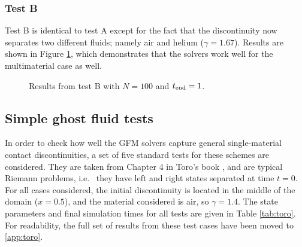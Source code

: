\documentclass[final,3p,twocolumn]{elsarticle}
\begin{document}
\subsubsection{Test B}

Test B is identical to test A except for the fact that the discontinuity now
separates two different fluids; namely air and helium ($\gamma=1.67$).  Results
are shown in Figure \ref{fig:testB}, which demonstrates that the solvers work
well for the multimaterial case as well. 


\begin{figure}[htb]
    \centering
    \caption[caption]
    {
        Results from test B with $N=100$ and $t_{\rm end}=1$. 
    }
    \label{fig:testB}
\end{figure}

\subsection{Simple ghost fluid tests}
\label{subsec:toro}

In order to check how well the GFM solvers capture general single-material
contact discontinuities, a set of five standard tests for these schemes are
considered. They are taken from Chapter 4 in Toro's book
\cite{toro2013riemann}, and are typical Riemann problems, i.e.~ they have left
and right states separated at time $t=0$. For all cases considered, the initial
discontinuity is located in the middle of the domain ($x=0.5$), and the
material considered is air, so $\gamma=1.4$.  The state parameters and final
simulation times for all tests are given in Table \ref{tab:toro}. For
readability, the full set of results from these test cases have been moved to
\ref{app:toro}. 
\end{document}
